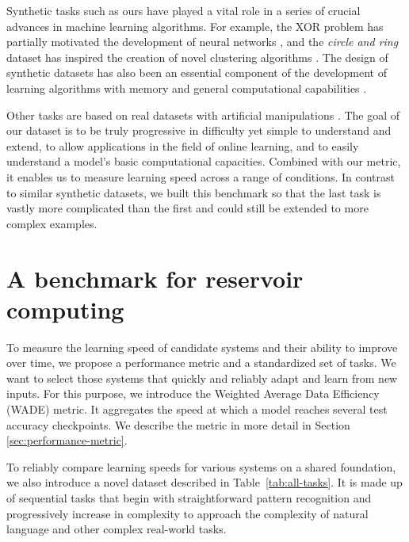 Synthetic tasks such as ours have played a vital role in a series of crucial
advances in machine learning algorithms. For example, the XOR problem has
partially motivated the development of neural networks
\parencite{minskyPerceptronsIntroductionComputational1972,
  rumelhartLearningInternalRepresentations1985}, and the \emph{circle and ring}
dataset has inspired the creation of novel clustering algorithms
\parencite{ngSpectralClusteringAnalysis2001}. The design of synthetic datasets has also been
an essential component of the development of learning algorithms with
memory and general computational capabilities
\parencite{hochreiterLongShortTermMemory1997,
  joulinInferringAlgorithmicPatterns2015, gravesNeuralTuringMachines2014,
  westonAICompleteQuestionAnswering2016, richardsonProbingNaturalLanguage2020}.

Other tasks are based on real datasets with artificial manipulations
\parencite{krizhevskyLearningMultipleLayers2009, srivastavaCompeteCompute2013a,
  goodfellowEmpiricalInvestigationCatastrophic2014,
  nguyenVariationalContinualLearning2017}. The goal of our dataset is to be
truly progressive in difficulty yet simple to understand and extend, to allow
applications in the field of online learning, and to easily understand a model's
basic computational capacities. Combined with our metric, it enables us to
measure learning speed across a range of conditions. In contrast to similar
synthetic datasets, we built this benchmark so that the last task is vastly more
complicated than the first and could still be extended to more complex examples.




\section{A benchmark for reservoir computing\label{sec:tasks}}
To measure the learning speed of candidate systems and their ability to improve
over time, we propose a performance metric and a standardized set of tasks. We
want to select those systems that quickly and reliably adapt and learn from new inputs.
For this purpose, we introduce the Weighted Average Data Efficiency (WADE)
metric. It aggregates the speed at which a model reaches several test accuracy
checkpoints. We describe the metric in more detail in Section
\ref{sec:performance-metric}.

To reliably compare learning speeds for various systems on a shared foundation,
we also introduce a novel dataset described in Table~\ref{tab:all-tasks}. It is
made up of sequential tasks that begin with straightforward pattern recognition
and progressively increase in complexity to approach the complexity of natural
language and other complex real-world tasks.


